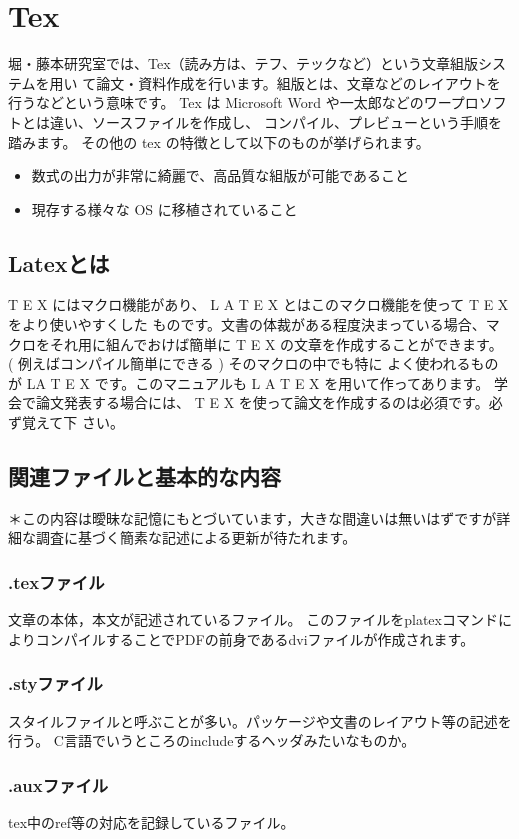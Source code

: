 \documentclass[a4paper,10pt,twocolumn,fleqn]{jarticle}
\begin{document}
\section{Tex}
堀・藤本研究室では、Tex（読み方は、テフ、テックなど）という文章組版システムを用い
て論文・資料作成を行います。組版とは、文章などのレイアウトを行うなどという意味です。
Tex は Microsoft Word や一太郎などのワープロソフトとは違い、ソースファイルを作成し、
コンパイル、プレビューという手順を踏みます。
その他の tex の特徴として以下のものが挙げられます。

\begin{itemize}
	\item  数式の出力が非常に綺麗で、高品質な組版が可能であること
	\item 現存する様々な OS に移植されていること
\end{itemize}	

\subsection{Latexとは}
T E X にはマクロ機能があり、 L A T E X とはこのマクロ機能を使って T E X をより使いやすくした
ものです。文書の体裁がある程度決まっている場合、マクロをそれ用に組んでおけば簡単に T E X
の文章を作成することができます。 ( 例えばコンパイル簡単にできる ) そのマクロの中でも特に
よく使われるものが LA T E X です。このマニュアルも L A T E X を用いて作ってあります。
学会で論文発表する場合には、 T E X を使って論文を作成するのは必須です。必ず覚えて下
さい。

\subsection{関連ファイルと基本的な内容}
＊この内容は曖昧な記憶にもとづいています，大きな間違いは無いはずですが詳細な調査に基づく簡素な記述による更新が待たれます。
\subsubsection*{.texファイル}
文章の本体，本文が記述されているファイル。
このファイルをplatexコマンドによりコンパイルすることでPDFの前身であるdviファイルが作成されます。
\subsubsection*{.styファイル}
スタイルファイルと呼ぶことが多い。パッケージや文書のレイアウト等の記述を行う。
C言語でいうところのincludeするヘッダみたいなものか。
\subsubsection*{.auxファイル}
tex中のref等の対応を記録しているファイル。
\end{document}
